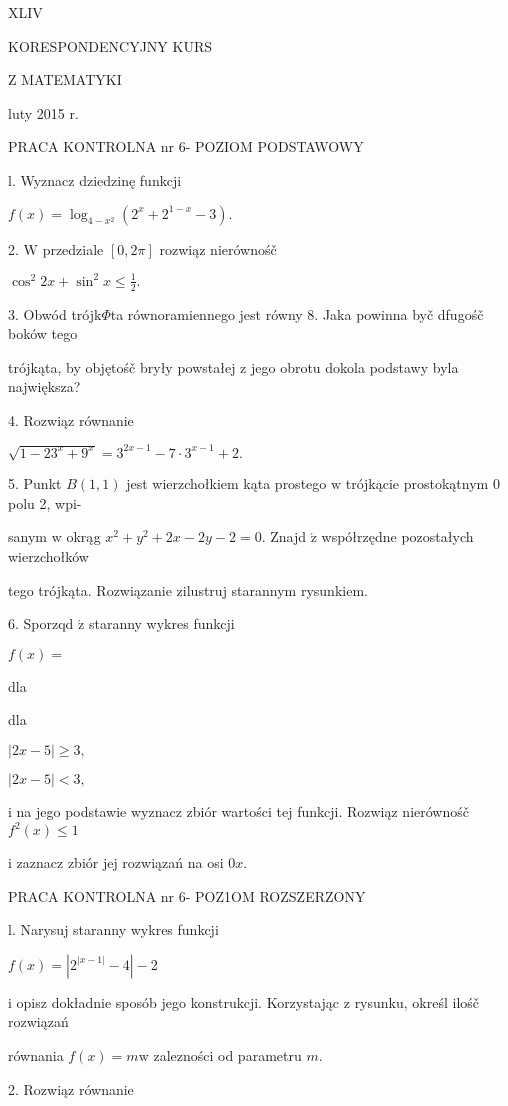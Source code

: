 \documentclass[a4paper,12pt]{article}
\begin{document}
XLIV

KORESPONDENCYJNY KURS

Z MATEMATYKI

luty 2015 r.

PRACA KONTROLNA nr 6- POZIOM PODSTAWOWY

l. Wyznacz dziedzinę funkcji

$f(x)=\log_{4-x^{2}}(2^{x}+2^{1-x}-3).$

2. $\mathrm{W}$ przedziale $[0,2\pi]$ rozwiąz nierównośč

$\displaystyle \cos^{2}2x+\sin^{2}x\leq\frac{1}{2}.$

3. Obwód trójk$\Phi$ta równoramiennego jest równy 8. Jaka powinna byč dfugośč boków tego

trójkąta, by objętośč bryły powstałej $\mathrm{z}$ jego obrotu dokola podstawy byla największa?

4. Rozwiąz równanie

$\sqrt{1-23^{x}+9^{x}}=3^{2x-1}-7\cdot 3^{x-1}+2.$

5. Punkt $B(1,1)$ jest wierzchołkiem kąta prostego $\mathrm{w}$ trójkącie prostokątnym $0$ polu 2, wpi-

sanym $\mathrm{w}$ okrąg $x^{2}+y^{2}+2x-2y-2=0.$ Znajd $\acute{\mathrm{z}}$ współrzędne pozostałych wierzchołków

tego trójkąta. Rozwiązanie zilustruj starannym rysunkiem.

6. Sporzqd $\acute{\mathrm{z}}$ staranny wykres funkcji

$f(x)=$

dla

dla

$|2x-5|\geq 3,$

$|2x-5|<3,$

$\mathrm{i}$ na jego podstawie wyznacz zbiór wartości tej funkcji. Rozwiąz nierównośč $f^{2}(x) \leq 1$

$\mathrm{i}$ zaznacz zbiór jej rozwiązań na osi $0x.$




PRACA KONTROLNA nr 6- POZ1OM ROZSZERZONY

l. Narysuj staranny wykres funkcji

$f(x)=|2^{|x-1|}-4|-2$

$\mathrm{i}$ opisz dokładnie sposób jego konstrukcji. Korzystając $\mathrm{z}$ rysunku, określ ilośč rozwiązań

równania $f(x)=m\mathrm{w}$ zalezności od parametru $m.$

2. Rozwiąz równanie
\end{document}
